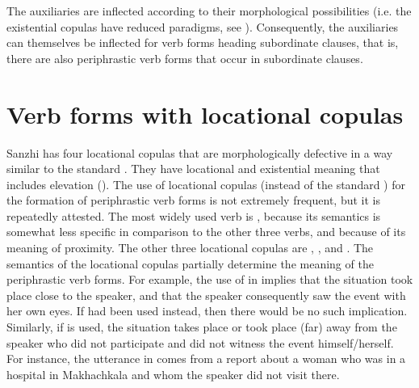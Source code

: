 The auxiliaries are inflected according to their morphological possibilities (i.e. the existential copulas have reduced paradigms, see ). Consequently, the auxiliaries can themselves be inflected for verb forms heading subordinate clauses, that is, there are also periphrastic verb forms that occur in subordinate clauses.



\section{Verb forms with locational copulas}
\label{sec:Verb forms with locational copulae}

Sanzhi has four locational copulas that are morphologically defective in a way similar to the standard . They have locational and existential meaning that includes elevation (). The use of locational copulas (instead of the standard ) for the formation of periphrastic verb forms is not extremely frequent, but it is repeatedly attested. The most widely used  verb is  , because its semantics is somewhat less specific in comparison to the other three  verbs, and because of its meaning of proximity. The other three locational copulas are  ,  , and  . The semantics of the locational copulas partially determine the meaning of the periphrastic verb forms. For example, the use of  in  implies that the situation took place close to the speaker, and that the speaker consequently saw the event with her own eyes. If  had been used instead, then there would be no such implication. Similarly, if  is used, the situation takes place or took place (far) away from the speaker who did not participate and did not witness the event himself/herself. For instance, the utterance in  comes from a report about a woman who was in a hospital in Makhachkala and whom the speaker did not visit there.

